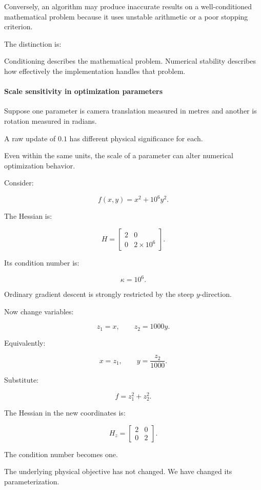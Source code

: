 Conversely, an algorithm may produce inaccurate results on a well-conditioned mathematical problem because it uses unstable arithmetic or a poor stopping criterion.

The distinction is:

Conditioning describes the mathematical problem. Numerical stability describes how effectively the implementation handles that problem.

\paragraph{Scale sensitivity in optimization parameters}\label{scale-sensitivity-in-optimization-parameters}

Suppose one parameter is camera translation measured in metres and another is rotation measured in radians.

A raw update of \(0.1\) has different physical significance for each.

Even within the same units, the scale of a parameter can alter numerical optimization behavior.

Consider:

\[
f(x,y)=x^2+10^6y^2.
\]

The Hessian is:

\[
H= \begin{bmatrix} 2&0\\ 0&2\times10^6 \end{bmatrix}.
\]

Its condition number is:

\[
\kappa=10^6.
\]

Ordinary gradient descent is strongly restricted by the steep \(y\)-direction.

Now change variables:

\[
z_1=x,\qquad z_2=1000y.
\]

Equivalently:

\[
x=z_1,\qquad y=\frac{z_2}{1000}.
\]

Substitute:

\[
f=z_1^2+z_2^2.
\]

The Hessian in the new coordinates is:

\[
H_z= \begin{bmatrix} 2&0\\ 0&2 \end{bmatrix}.
\]

The condition number becomes one.

The underlying physical objective has not changed. We have changed its parameterization.

